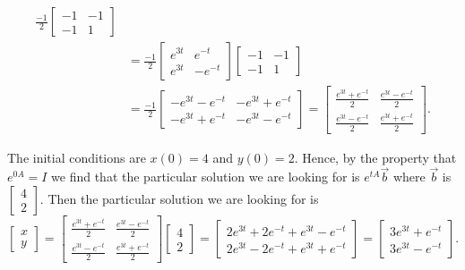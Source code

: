 \begin{example}
\begin{equation*}
\begin{split}
\frac{-1}{2}
\begin{bmatrix}
-1 & -1 \\
-1 & 1
\end{bmatrix}
\\
& =
\frac{-1}{2}
\begin{bmatrix}
e^{3t} & e^{-t} \\
e^{3t} & -e^{-t}
\end{bmatrix}
\begin{bmatrix}
-1 & -1 \\
-1 & 1
\end{bmatrix}
\\
& =
\frac{-1}{2}
\begin{bmatrix}
-e^{3t}-e^{-t} & -e^{3t}+e^{-t} \\
-e^{3t}+e^{-t} & -e^{3t}-e^{-t}
\end{bmatrix}
 =
\begin{bmatrix}
\frac{e^{3t}+e^{-t}}{2} & \frac{e^{3t}-e^{-t}}{2} \\
\frac{e^{3t}-e^{-t}}{2} & \frac{e^{3t}+e^{-t}}{2}
\end{bmatrix} .
\end{split}
\end{equation*}

The initial conditions are $x(0) = 4$ and $y(0) = 2$.  Hence, by the property
that $e^{0A} = I$ we find that the particular solution we are looking for
is $e^{tA} \vec{b}$ where $\vec{b}$ is $\left[
\begin{smallmatrix} 4 \\ 2 \end{smallmatrix} \right]$.
Then the particular solution we are looking for is
\begin{equation*}
\begin{bmatrix}
x \\ y
\end{bmatrix}
=
\begin{bmatrix}
\frac{e^{3t}+e^{-t}}{2} & \frac{e^{3t}-e^{-t}}{2} \\
\frac{e^{3t}-e^{-t}}{2} & \frac{e^{3t}+e^{-t}}{2}
\end{bmatrix}
\begin{bmatrix}
4 \\ 2
\end{bmatrix}
=
\begin{bmatrix}
2e^{3t}+2e^{-t} + e^{3t}-e^{-t} \\
2e^{3t}-2e^{-t} + e^{3t}+e^{-t}
\end{bmatrix}
=
\begin{bmatrix}
3e^{3t}+e^{-t} \\
3e^{3t}-e^{-t}
\end{bmatrix} .
\end{equation*}
\end{example}

